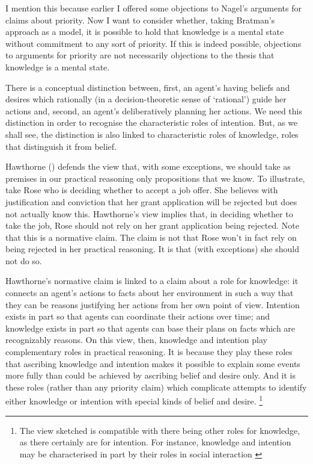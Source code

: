 \documentclass[12pt,\papersize]{extarticle}
\begin{document}
I mention this because  earlier I offered some objections to Nagel's arguments for claims about priority.
Now I want to
consider whether, taking Bratman's approach as a model,
it is possible to  hold that
 knowledge is a mental state 
without
commitment to any sort of priority.
If this is indeed possible, 
objections to arguments for priority 
are not necessarily
objections to the thesis that knowledge is a mental state.


There is a conceptual distinction between,
first,
an agent's having beliefs and desires which rationally 
(in a decision-theoretic sense of `rational') 
guide her actions
and,
second,
 an agent's deliberatively planning her actions.
We need this distinction in order to recognise the characteristic roles of intention.
But, as we shall see, the distinction is also linked to characteristic roles of knowledge, roles that 
distinguish 
it from belief.

Hawthorne (\citeyear[pp.\ 29--31]{Hawthorne:2004ov}) defends the view that, with some exceptions, we should take as premises in our practical reasoning only propositions that we know.  
To illustrate, take Rose who is deciding whether to accept a job offer.
She believes with justification and conviction that her grant application will be rejected but does not actually know this.  
Hawthorne's view implies that, in deciding whether to take the job, Rose should not rely on her grant application being rejected.  
Note that this is a normative claim.  
The claim is not that Rose won't in fact rely on being rejected in her practical reasoning.  
It is that (with exceptions) she should not do so.  

Hawthorne's normative claim is linked to a claim about a role for knowledge: 
it connects an agent's actions to facts about her environment in such a way that they can be reasons justifying her actions from her own point of view.
Intention exists in part so that agents can coordinate their actions over time; 
and 
knowledge exists in part so that agents can base their plans on facts which are recognizably reasons.
On this view, then, knowledge and intention play complementary roles in practical reasoning.
It is because they play these roles that ascribing knowledge and intention makes it possible to explain some events more fully than could be achieved by ascribing belief and desire only.
And it is these roles 
(rather than any priority claim)
which complicate attempts to identify either knowledge or intention with special kinds of belief and desire.%
\footnote{
The view sketched is compatible with there being other roles for knowledge, as there certainly are for intention.
For instance, knowledge and intention may be characterised in part by their roles in social interaction 
\citep[cf.][]{Craig:1990wt,Bratman:2009lv}
}
\end{document}
